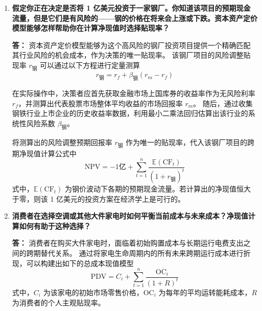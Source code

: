 \begin{enumerate}[label=\textbf{\arabic*.}, leftmargin=*]
		\textbf{答：}
		在资本资产定价模型中，市场回报率是指投资者购买了由整个股票市场所有资产构成的风险组合时，所能获得的预期收益率。
		该模型的经典线性均衡方程为
		\[
		r_i = r_f + \beta_i (r_m - r_f)
		\]
		式中，$r_m$ 即为市场回报率，$r_f$ 为无风险利率，两者之差 $(r_m - r_f)$ 即为股票市场的整体风险溢价。
		
		市场回报率必然高于无风险利率。因为尽管市场组合消除了所有的特质性风险，但它依然承载着与整体实体经济周期高度挂钩的系统性风险。
		资产的 $\beta_i$ 值用于衡量该特定资产的收益率对整个市场组合波动幅度的敏感贡献度
		\[
		\beta_i = \frac{\text{Cov}(r_i, r_m)}{\text{Var}(r_m)}
		\]
		
		高 $\beta$ 值的资产意味着其收益对市场系统性波动的反应更为剧烈，即蕴含着更大的不可分散风险。
		由于这部分系统性风险无法通过资产分散化进行稀释，它显著推高了资本的机会成本，市场均衡要求其必须匹配更高的预期回报率 $r_i$。
		
		\item \textbf{假定你正在决定是否将 1 亿美元投资于一家钢厂。你知道该项目的预期现金流量，但是它们是有风险的——钢的价格在将来会上涨或下跌。资本资产定价模型能够怎样帮助你在计算净现值时选择贴现率？}
		
		\textbf{答：}
		资本资产定价模型能够为这个高风险的钢厂投资项目提供一个精确匹配其行业风险的机会成本，作为决策的唯一贴现率。
		该钢厂项目的风险调整贴现率 $r_{\text{钢}}$ 可以通过以下方程进行定量测算
		\[
		r_{\text{钢}} = r_f + \beta_{\text{钢}} (r_m - r_f)
		\]
		
		在实际操作中，决策者应首先获取金融市场上国库券的收益率作为无风险利率 $r_f$，并测算出代表股票市场整体平均收益的市场回报率 $r_m$。
		随后，通过收集钢铁行业上市企业的历史收益率数据，利用最小二乘法回归估算出该行业的系统性风险系数 $\beta_{\text{钢}}$。
		
		将测算出的风险调整预期回报率 $r_{\text{钢}}$ 作为唯一的贴现率，代入该钢厂项目的跨期净现值计算公式中
		\[
		\text{NPV} = -1\text{亿} + \sum_{t=1}^n \frac{\mathbb{E}(\text{CF}_t)}{(1 + r_{\text{钢}})^t}
		\]
		式中，$\mathbb{E}(\text{CF}_t)$ 为钢价波动下各期的预期现金流量。若计算出的净现值恒大于零，则该 1 亿美元的投资方案在经济学上是可行的。
		
		\item \textbf{消费者在选择空调或其他大件家电时如何平衡当前成本与未来成本？净现值计算如何有助于这种选择？}
		
		\textbf{答：}
		消费者在购买大件家电时，面临着初始购置成本与长期运行电费支出之间的跨期替代关系。
		通过将家电生命周期内的所有未来跨期运行成本进行折现，可以构建出如下的总成本现值模型
		\[
		\text{PDV} = C_i + \sum_{t=1}^n \frac{\text{OC}_{i}}{(1+R)^t}
		\]
		式中，$C_i$ 为该家电的初始市场零售价格，$\text{OC}_{i}$ 为每年的平均运转能耗成本，$R$ 为消费者的个人主观贴现率。
		

\end{enumerate}
